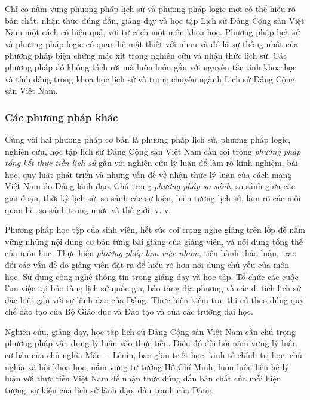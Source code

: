 Chỉ có nắm vững phương pháp lịch sử và phương pháp logic mới có thể hiểu rõ bản chất, nhận thức đúng đắn, giảng dạy và học tập Lịch sử Đảng Cộng sản Việt Nam một cách có hiệu quả, với tư cách một môn khoa học. Phương pháp lịch sử và phương pháp logic có quan hệ mật thiết với nhau và đó là sự thống nhất của phương pháp biện chứng mác xít trong nghiên cứu và nhận thức lịch sử. Các phương pháp đó không tách rời mà luôn luôn gắn với nguyên tắc tính khoa học và tính đảng trong khoa học lịch sử và trong chuyên ngành Lịch sử Đảng Cộng sản Việt Nam.

\subsubsection{Các phương pháp khác}
Cùng với hai phương pháp cơ bản là phương pháp lịch sử, phương pháp logic, nghiên cứu, học tập lịch sử Đảng Cộng sản Việt Nam cần coi trọng \textit{phương pháp tổng kết thực tiễn lịch sử} gắn với nghiên cứu lý luận để làm rõ kinh nghiệm, bài học, quy luật phát triển và những vấn đề về nhận thức lý luận của cách mạng Việt Nam do Đảng lãnh đạo. Chú trọng \textit{phương pháp so sánh}, so sánh giữa các giai đoạn, thời kỳ lịch sử, so sánh các sự kiện, hiện tượng lịch sử, làm rõ các mối quan hệ, so sánh trong nước và thế giới, v. v.

Phương pháp học tập của sinh viên, hết sức coi trọng nghe giảng trên lớp để nắm vững những nội dung cơ bản từng bài giảng của giảng viên, và nội dung tổng thể của môn học. Thực hiện \textit{phương pháp làm việc nhóm}, tiến hành thảo luận, trao đổi các vấn đề do giảng viên đặt ra để hiểu rõ hơn nội dung chủ yếu của môn học. Sử dụng công nghệ thông tin trong giảng dạy và học tập. Tổ chức các cuộc làm việc tại bảo tàng lịch sử quốc gia, bảo tàng địa phương và các di tích lịch sử đặc biệt gắn với sự lãnh đạo của Đảng. Thực hiện kiểm tra, thi cử theo đúng quy chế đào tạo của Bộ Giáo dục và Đào tạo và của các trường đại học.

Nghiên cứu, giảng dạy, học tập lịch sử Đảng Cộng sản Việt Nam cần chú trọng phương pháp vận dụng lý luận vào thực tiễn. Điều đó đòi hỏi nắm vững lý luận cơ bản của chủ nghĩa Mác $-$ Lênin, bao gồm triết học, kinh tế chính trị học, chủ nghĩa xã hội khoa học, nắm vững tư tưởng Hồ Chí Minh, luôn luôn liên hệ lý luận với thực tiễn Việt Nam để nhận thức đúng đắn bản chất của mỗi hiện tượng, sự kiện của lịch sử lãnh đạo, đấu tranh của Đảng.


